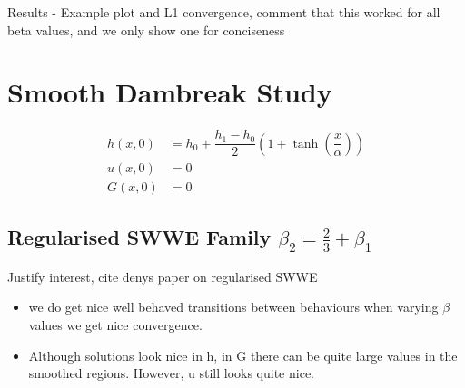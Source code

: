 \documentclass[10pt]{article}
\begin{document}

Results - Example plot and L1 convergence, comment that this worked for all beta values, and we only show one for conciseness


\section{Smooth Dambreak Study}
\begin{align}
h(x,0) & = h_0 + \dfrac{h_1 - h_0}{2} \left(1 + \tanh\left(\dfrac{x}{\alpha}\right)\right)  \\
u(x,0) &= 0 \\
G(x,0) &= 0
\end{align}


\subsection{Regularised SWWE Family $\beta_2 = \frac{2}{3} + \beta_1$}
Justify interest, cite denys paper on regularised SWWE

\begin{itemize}
	\item we do get nice well behaved transitions between behaviours when varying $\beta$ values
	we get nice convergence.
	\item Although solutions look nice in h, in G there can be quite large values in the smoothed regions. However, u still looks quite nice. 
\end{itemize}
\end{document}
